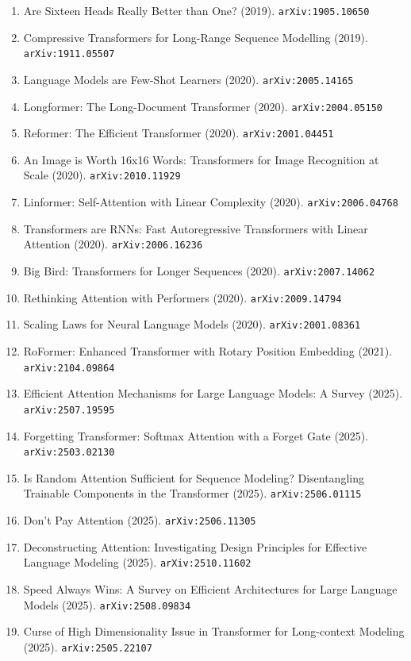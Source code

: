 \documentclass[11pt]{article}
\begin{document}
\begin{enumerate}
  \item Are Sixteen Heads Really Better than One? (2019). \texttt{arXiv:1905.10650}
  \item Compressive Transformers for Long-Range Sequence Modelling (2019). \texttt{arXiv:1911.05507}
  \item Language Models are Few-Shot Learners (2020). \texttt{arXiv:2005.14165}
  \item Longformer: The Long-Document Transformer (2020). \texttt{arXiv:2004.05150}
  \item Reformer: The Efficient Transformer (2020). \texttt{arXiv:2001.04451}
  \item An Image is Worth 16x16 Words: Transformers for Image Recognition at
  Scale (2020). \texttt{arXiv:2010.11929}
  \item Linformer: Self-Attention with Linear Complexity (2020). \texttt{arXiv:2006.04768}
  \item Transformers are RNNs: Fast Autoregressive Transformers with Linear
  Attention (2020). \texttt{arXiv:2006.16236}
  \item Big Bird: Transformers for Longer Sequences (2020). \texttt{arXiv:2007.14062}
  \item Rethinking Attention with Performers (2020). \texttt{arXiv:2009.14794}
  \item Scaling Laws for Neural Language Models (2020). \texttt{arXiv:2001.08361}
  \item RoFormer: Enhanced Transformer with Rotary Position Embedding (2021). \texttt{arXiv:2104.09864}
  \item Efficient Attention Mechanisms for Large Language Models: A Survey (2025). \texttt{arXiv:2507.19595}
  \item Forgetting Transformer: Softmax Attention with a Forget Gate (2025). \texttt{arXiv:2503.02130}
  \item Is Random Attention Sufficient for Sequence Modeling? Disentangling Trainable Components in the Transformer (2025). \texttt{arXiv:2506.01115}
  \item Don't Pay Attention (2025). \texttt{arXiv:2506.11305}
  \item Deconstructing Attention: Investigating Design Principles for Effective Language Modeling (2025). \texttt{arXiv:2510.11602}
  \item Speed Always Wins: A Survey on Efficient Architectures for Large Language Models (2025). \texttt{arXiv:2508.09834}
  \item Curse of High Dimensionality Issue in Transformer for Long-context Modeling (2025). \texttt{arXiv:2505.22107}

\end{enumerate}
\end{document}
